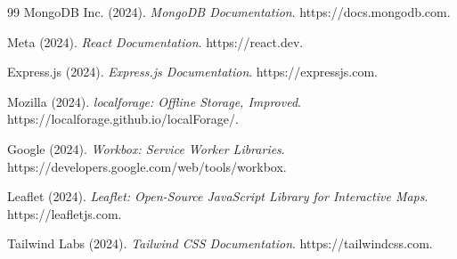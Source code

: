 \begin{thebibliography}{99}
MongoDB Inc. (2024). \textit{MongoDB Documentation}. https://docs.mongodb.com.

Meta (2024). \textit{React Documentation}. https://react.dev.

Express.js (2024). \textit{Express.js Documentation}. https://expressjs.com.

Mozilla (2024). \textit{localforage: Offline Storage, Improved}. https://localforage.github.io/localForage/.

Google (2024). \textit{Workbox: Service Worker Libraries}. https://developers.google.com/web/tools/workbox.

Leaflet (2024). \textit{Leaflet: Open-Source JavaScript Library for Interactive Maps}. https://leafletjs.com.

Tailwind Labs (2024). \textit{Tailwind CSS Documentation}. https://tailwindcss.com.

\end{thebibliography}
